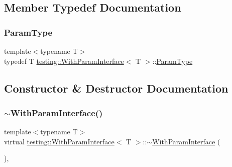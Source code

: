 \subsection{Member Typedef Documentation}
\mbox{\label{classtesting_1_1WithParamInterface_a343febaaebf1f025bda484f841d4fec1}} 
\subsubsection{\texorpdfstring{ParamType}{ParamType}}
{\footnotesize\ttfamily template$<$typename T$>$ \\
typedef T \mbox{\hyperlink{classtesting_1_1WithParamInterface}{testing\+::\+With\+Param\+Interface}}$<$ T $>$\+::\mbox{\hyperlink{classtesting_1_1WithParamInterface_a343febaaebf1f025bda484f841d4fec1}{Param\+Type}}}



\subsection{Constructor \& Destructor Documentation}
\mbox{\label{classtesting_1_1WithParamInterface_a4e170bd42fa5e8ce48b80cee6bb52e26}} 
\subsubsection{\texorpdfstring{$\sim$WithParamInterface()}{~WithParamInterface()}}
{\footnotesize\ttfamily template$<$typename T$>$ \\
virtual \mbox{\hyperlink{classtesting_1_1WithParamInterface}{testing\+::\+With\+Param\+Interface}}$<$ T $>$\+::$\sim$\mbox{\hyperlink{classtesting_1_1WithParamInterface}{With\+Param\+Interface}} (\begin{DoxyParamCaption}{ }\end{DoxyParamCaption})\hspace{0.3cm}{\ttfamily [inline]}, {\ttfamily [virtual]}}



